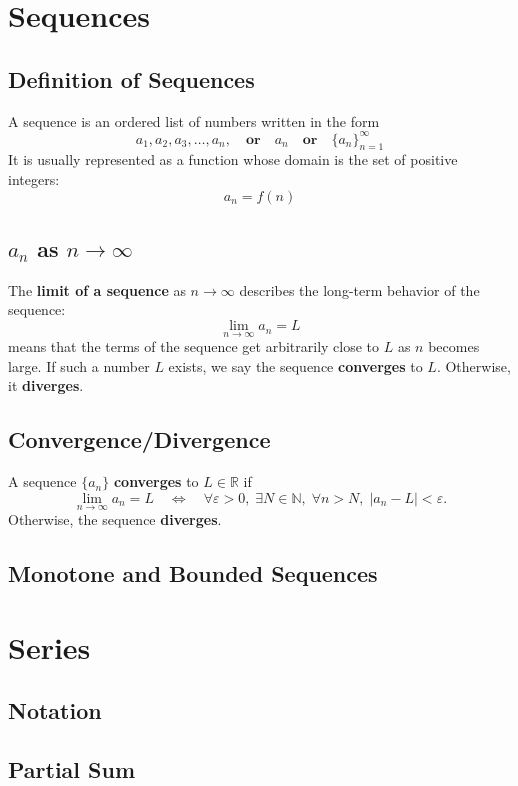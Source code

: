 \documentclass[11pt]{article}
\begin{document}
\pagestyle{plain}
\begin{center}
  \tableofcontents
\end{center}
\newpage
\setcounter{page}{1}
\pagestyle{fancy}

\section{Sequences}
\subsection{Definition of Sequences}
A sequence is an ordered list of numbers written in the form 
\[
  a_1, a_2, a_3, \dots, a_n, \quad\textbf{or}\quad a_n\quad\textbf{or}\quad\{a_n\}_{n=1}^\infty
\]
It is usually represented as a function whose domain is the set of positive integers:
\[
    a_n = f(n)
\]
\subsection{$a_n$ as $n\to\infty$}
The \textbf{limit of a sequence} as $n \to \infty$ describes the long-term behavior of the sequence:
\[
    \lim_{n \to \infty} a_n = L
\]
means that the terms of the sequence get arbitrarily close to $L$ as $n$ becomes large. If such a number $L$ exists, we say the sequence \textbf{converges} to $L$. Otherwise, it \textbf{diverges}.
\subsection{Convergence/Divergence}
A sequence $\{a_n\}$ \textbf{converges} to $L \in \mathbb{R}$ if
\[
  \lim_{n \to \infty} a_n = L \quad \Longleftrightarrow \quad \forall \varepsilon > 0, \; \exists N \in \mathbb{N}, \; \forall n > N, \; |a_n - L| < \varepsilon.
\]
Otherwise, the sequence \textbf{diverges}.
\subsection{Monotone and Bounded Sequences}
\section{Series}
\subsection{Notation}
\subsection{Partial Sum}
\end{document}
